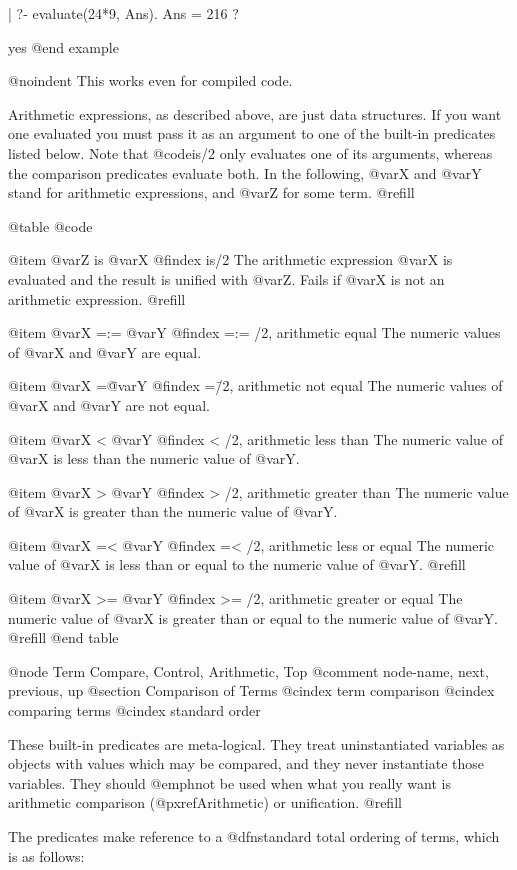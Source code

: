 | ?- evaluate(24*9, Ans).
Ans = 216 ?

yes
@end example

@noindent
This works even for compiled code.

Arithmetic expressions, as described above, are just data structures.
If you want one evaluated you must pass it as an argument to one of the
built-in predicates listed below.  Note that @code{is/2} only evaluates
one of its arguments, whereas the comparison predicates evaluate both.
In the following, @var{X} and @var{Y} stand for arithmetic expressions,
and @var{Z} for some term. @refill

@table @code

@item @var{Z} is @var{X}
@findex is/2
The arithmetic expression @var{X} is evaluated and the result is unified with
@var{Z}.  Fails if @var{X} is not an arithmetic expression. @refill

@item @var{X} =:= @var{Y}
@findex =:= /2, arithmetic equal
The numeric values of @var{X} and @var{Y} are equal.

@item @var{X} =\= @var{Y}
@findex =\= /2, arithmetic not equal
The numeric values of @var{X} and @var{Y} are not equal.

@item @var{X} < @var{Y}
@findex < /2, arithmetic less than
The numeric value of @var{X} is less than the numeric value of @var{Y}.

@item @var{X} > @var{Y}
@findex > /2, arithmetic greater than
The numeric value of @var{X} is greater than the numeric value of
@var{Y}.

@item @var{X} =< @var{Y}
@findex =< /2, arithmetic less or equal
The numeric value of @var{X} is less than or equal to the numeric
value of @var{Y}. @refill

@item @var{X} >= @var{Y}
@findex >= /2, arithmetic greater or equal
The numeric value of @var{X} is greater than or equal to the numeric
value of @var{Y}. @refill
@end table

@node Term Compare, Control, Arithmetic, Top
@comment  node-name,  next,  previous,  up
@section Comparison of Terms
@cindex term comparison
@cindex comparing terms
@cindex standard order

These built-in predicates are meta-logical.  They treat uninstantiated
variables as objects with values which may be compared, and they never
instantiate those variables.  They should @emph{not} be used when what
you really want is arithmetic comparison (@pxref{Arithmetic}) or
unification. @refill

The predicates make reference to a @dfn{standard total ordering} of
terms, which is as follows:

